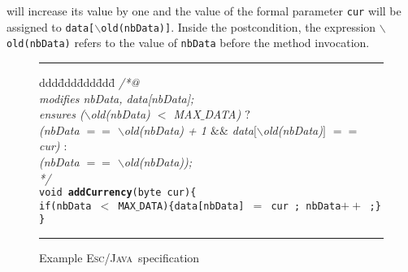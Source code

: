 \documentclass[a4paper]{llncs}
\newcommand{\escj}{\textsc{Esc/Java}}
\begin{document}
will increase its value by one and the value of the formal parameter 
\texttt{cur} will be assigned to \texttt{data[\(\backslash\)old(nbData)]}.  
Inside the postcondition, the expression 
\texttt{$\backslash$old(nbData)} refers to the value of 
\texttt{nbData} before the method invocation. 
\begin{figure}[htb]
\rule{\linewidth}{0.25mm}
\begin{tabbing}
ddd\=ddd\=ddd\=ddd\= \kill 
\textsl{/*@} \\
\>\textsl{modifies nbData, data[nbData];}  \\
\>\textsl{ensures ($\backslash$old(nbData) $<$ MAX$\_$DATA) $?$}  \\
\>\>\>\textsl{(nbData $==$ $\backslash$old(nbData) + 1 $\&\&$ data$[\backslash$old(nbData)$]$ $==$ cur) $:$}  \\
\>\>\>\textsl{(nbData $==$ $\backslash$old(nbData));}  \\
\textsl{*/} \\
\texttt{void {\bf addCurrency}(byte cur)\{ } \\
\>\texttt{if(nbData $<$ MAX$\_$DATA)\{data[nbData] $=$ cur ; nbData$++$ ;\}}  \\
\texttt{\}}
\end{tabbing}
\caption{Example \escj~specification} 
\label{fig-add-cur} 
\rule{\linewidth}{0.25mm} 
\end{figure} 
\end{document}
